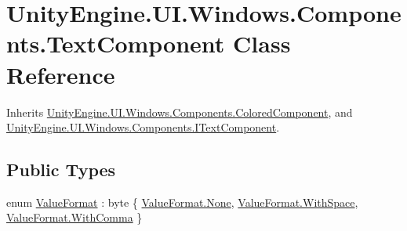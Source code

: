 \hypertarget{class_unity_engine_1_1_u_i_1_1_windows_1_1_components_1_1_text_component}{}\section{Unity\+Engine.\+U\+I.\+Windows.\+Components.\+Text\+Component Class Reference}
\label{class_unity_engine_1_1_u_i_1_1_windows_1_1_components_1_1_text_component}


Inherits \hyperlink{class_unity_engine_1_1_u_i_1_1_windows_1_1_components_1_1_colored_component}{Unity\+Engine.\+U\+I.\+Windows.\+Components.\+Colored\+Component}, and \hyperlink{interface_unity_engine_1_1_u_i_1_1_windows_1_1_components_1_1_i_text_component}{Unity\+Engine.\+U\+I.\+Windows.\+Components.\+I\+Text\+Component}.

\subsection*{Public Types}
\begin{DoxyCompactItemize}
\item 
enum \hyperlink{class_unity_engine_1_1_u_i_1_1_windows_1_1_components_1_1_text_component_adf4a7bac85dfe1b32ebe6309e5386f89}{Value\+Format} \+: byte \{ \hyperlink{class_unity_engine_1_1_u_i_1_1_windows_1_1_components_1_1_text_component_adf4a7bac85dfe1b32ebe6309e5386f89a6adf97f83acf6453d4a6a4b1070f3754}{Value\+Format.\+None}, 
\hyperlink{class_unity_engine_1_1_u_i_1_1_windows_1_1_components_1_1_text_component_adf4a7bac85dfe1b32ebe6309e5386f89a0d9132a2224916e7fddbd1e89ec6eb1d}{Value\+Format.\+With\+Space}, 
\hyperlink{class_unity_engine_1_1_u_i_1_1_windows_1_1_components_1_1_text_component_adf4a7bac85dfe1b32ebe6309e5386f89a84d776ed5c2fdd9a4efc9f04c49f5418}{Value\+Format.\+With\+Comma}
 \}
\end{DoxyCompactItemize}
